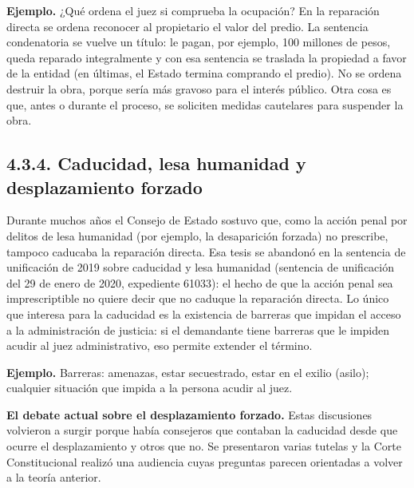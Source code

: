 \begin{ejemplo}
\textcolor[HTML]{4F6228}{\textbf{Ejemplo. }}¿Qué ordena el juez si comprueba la ocupación? En la reparación directa se ordena reconocer al propietario el valor del predio. La sentencia condenatoria se vuelve un título: le pagan, por ejemplo, 100 millones de pesos, queda reparado integralmente y con esa sentencia se traslada la propiedad a favor de la entidad (en últimas, el Estado termina comprando el predio). No se ordena destruir la obra, porque sería más gravoso para el interés público. Otra cosa es que, antes o durante el proceso, se soliciten medidas cautelares para suspender la obra.
\end{ejemplo}
\subsection{4.3.4. Caducidad, lesa humanidad y desplazamiento forzado}
Durante muchos años el Consejo de Estado sostuvo que, como la acción penal por delitos de lesa humanidad (por ejemplo, la desaparición forzada) no prescribe, tampoco caducaba la reparación directa. Esa tesis se abandonó en la sentencia de unificación de 2019 sobre caducidad y lesa humanidad (sentencia de unificación del 29 de enero de 2020, expediente 61033): el hecho de que la acción penal sea imprescriptible no quiere decir que no caduque la reparación directa. Lo único que interesa para la caducidad es la existencia de barreras que impidan el acceso a la administración de justicia: si el demandante tiene barreras que le impiden acudir al juez administrativo, eso permite extender el término.

\begin{ejemplo}
\textcolor[HTML]{4F6228}{\textbf{Ejemplo. }}Barreras: amenazas, estar secuestrado, estar en el exilio (asilo); cualquier situación que impida a la persona acudir al juez.
\end{ejemplo}
\textbf{El debate actual sobre el desplazamiento forzado.} Estas discusiones volvieron a surgir porque había consejeros que contaban la caducidad desde que ocurre el desplazamiento y otros que no. Se presentaron varias tutelas y la Corte Constitucional realizó una audiencia cuyas preguntas parecen orientadas a volver a la teoría anterior.

